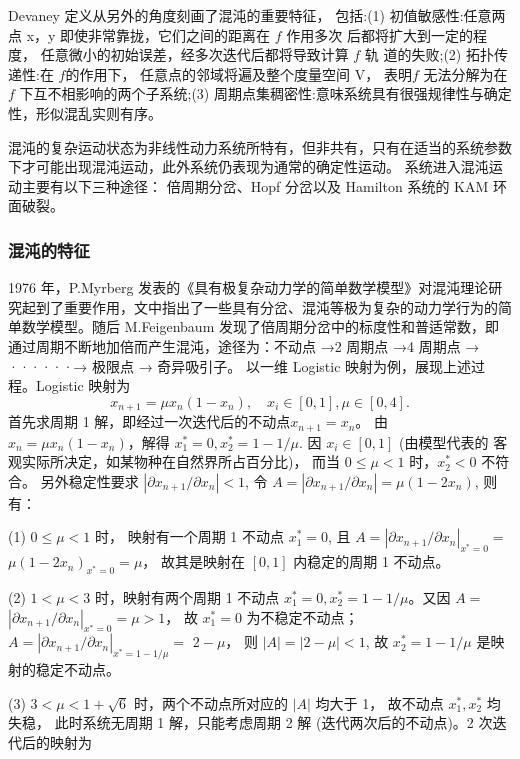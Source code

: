 Devaney 定义从另外的角度刻画了混沌的重要特征， 包括:(1) 初值敏感性:任意两点 x，y 即使非常靠拢，它们之间的距离在 $f$ 作用多次
后都将扩大到一定的程度， 任意微小的初始误差，经多次迭代后都将导致计算 $f$ 轨 道的失败;(2) 拓扑传递性:在 $f $的作用下， 任意点的邻域将遍及整个度量空间 V，
表明$f$ 无法分解为在 $f$ 下互不相影响的两个子系统;(3) 周期点集稠密性:意味系统具有很强规律性与确定性，形似混乱实则有序。\par
混沌的复杂运动状态为非线性动力系统所特有，但非共有，只有在适当的系统参数下才可能出现混沌运动，此外系统仍表现为通常的确定性运动。 系统进入混沌运动主要有以下三种途径：
倍周期分岔、Hopf 分岔以及 Hamilton 系统的 KAM 环面破裂。

\subsubsection{混沌的特征}
1976 年，P.Myrberg 发表的《具有极复杂动力学的简单数学模型》对混沌理论研究起到了重要作用，文中指出了一些具有分岔、混沌等极为复杂的动力学行为的简
单数学模型。随后 M.Feigenbaum 发现了倍周期分岔中的标度性和普适常数，即通过周期不断地加倍而产生混沌，途径为：不动点 →2 周期点 →4 周期点 → ······→ 极限点 → 奇异吸引子。
以一维 Logistic 映射为例，展现上述过程。Logistic 映射为
\begin{equation}
    x_{n+1}=\mu x_n\left(1-x_n\right), \quad x_i \in[0,1], \mu \in[0,4] .
\end{equation}
首先求周期 1 解，即经过一次迭代后的不动点$x_{n+1}=x_n$。
由 $x_n=\mu x_n\left(1-x_n\right)$，解得 $x_1^*=0, x_2^*=1-1 / \mu$. 因 $x_i \in[0,1]$ (由模型代表的 客观实际所决定，如某物种在自然界所占百分比)， 而当 $0 \leqslant \mu<1$ 时，$x_2^*<0$ 不符
合。 另外稳定性要求 $\left|\partial x_{n+1} / \partial x_n\right|<1$, 令 $A=\left|\partial x_{n+1} / \partial x_n\right|=\mu\left(1-2 x_n\right)$, 则有：\par
(1) $0 \leqslant \mu<1$ 时， 映射有一个周期 1 不动点 $x_1^*=0$, 且 $A=\left|\partial x_{n+1} / \partial x_n\right|_{x^*=0}=$ $\mu\left(1-2 x_n\right)_{x^*=0}=\mu$， 
故其是映射在 $[0,1]$ 内稳定的周期 1 不动点。\par
(2) $1<\mu<3$ 时，映射有两个周期 1 不动点 $x_1^*=0, x_2^*=1-1 / \mu$。又因 $A=$ $\left|\partial x_{n+1} / \partial x_n\right|_{x^*=0}=\mu>1$，
故 $x_1^*=0$ 为不稳定不动点；$A=\left|\partial x_{n+1} / \partial x_n\right|_{x^*=1-1 / \mu}=$ $2-\mu$，
则 $|A|=|2-\mu|<1$, 故 $x_2^*=1-1 / \mu$ 是映射的稳定不动点。\par
(3) $3<\mu<1+\sqrt{6}$ 时，两个不动点所对应的 $|A|$ 均大于 1， 故不动点 $x_1^*, x_2^*$ 均 失稳， 此时系统无周期 1 解，只能考虑周期 2 解 (迭代两次后的不动点)。2 次迭代后的映射为

